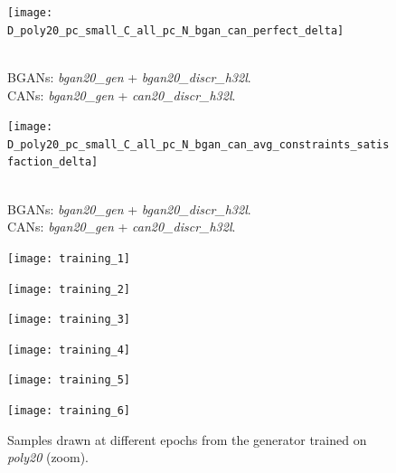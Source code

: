 \begin{figure}[ht]
    \centering
    \begin{minipage}[t]{0.45\textwidth}
        \centering
        \texttt{[image: D\_poly20\_pc\_small\_C\_all\_pc\_N\_bgan\_can\_perfect\_delta]}
        \caption{\\BGANs: \textit{bgan20\_gen} + \textit{bgan20\_discr\_h32l}.\\
        CANs: \textit{bgan20\_gen} + \textit{can20\_discr\_h32l}.}
        \label{fig:D_poly20_pc_small_C_all_pc_N_bgan_can_perfect_delta}
    \end{minipage}
    \hfill
    \begin{minipage}[t]{0.45\textwidth}
        \centering
        \texttt{[image: D\_poly20\_pc\_small\_C\_all\_pc\_N\_bgan\_can\_avg\_constraints\_satisfaction\_delta]}
        \caption{\\BGANs: \textit{bgan20\_gen} + \textit{bgan20\_discr\_h32l}.\\
        CANs: \textit{bgan20\_gen} + \textit{can20\_discr\_h32l}.}
        \label{fig:D_poly20_pc_small_C_all_pc_N_bgan_can_avg_constraints_satisfaction_delta}
    \end{minipage}
\end{figure}


\begin{figure}[ht]
    \centering
    \begin{minipage}{0.32\textwidth}
        \centering
        \texttt{[image: training\_1]}
    \end{minipage}
    \begin{minipage}{0.32\textwidth}
        \centering
        \texttt{[image: training\_2]}
    \end{minipage}
    \begin{minipage}{0.32\textwidth}
        \centering
        \texttt{[image: training\_3]}
    \end{minipage}
    \vspace{0.3cm}
    \begin{minipage}{0.32\textwidth}
        \centering
        \texttt{[image: training\_4]}
    \end{minipage}
    \begin{minipage}{0.32\textwidth}
        \centering
        \texttt{[image: training\_5]}
    \end{minipage}
    \begin{minipage}{0.32\textwidth}
        \centering
        \texttt{[image: training\_6]}
    \end{minipage}
    \caption{Samples drawn at different epochs from the generator trained on \textit{poly20} (zoom).}
\end{figure}


